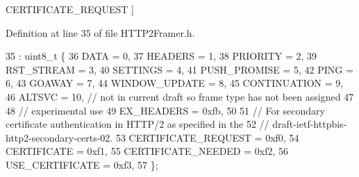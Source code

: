 \begin{Desc}
\begin{description}
{C\+E\+R\+T\+I\+F\+I\+C\+A\+T\+E\+\_\+\+R\+E\+Q\+U\+E\+ST\label{namespaceproxygen_1_1http2_a60a5f26de8e64ad7cc596791738df31ead3d3b002c0022969e52f9b0e87b8823e}
}]\item[{\em 
C\+E\+R\+T\+I\+F\+I\+C\+A\+TE\label{namespaceproxygen_1_1http2_a60a5f26de8e64ad7cc596791738df31eaad1694fa18786504d416601fa3e96d01}
}]\item[{\em 
C\+E\+R\+T\+I\+F\+I\+C\+A\+T\+E\+\_\+\+N\+E\+E\+D\+ED\label{namespaceproxygen_1_1http2_a60a5f26de8e64ad7cc596791738df31eae8c183fafade6ecd07a1f2fa4772ff36}
}]\item[{\em 
U\+S\+E\+\_\+\+C\+E\+R\+T\+I\+F\+I\+C\+A\+TE\label{namespaceproxygen_1_1http2_a60a5f26de8e64ad7cc596791738df31eafc95c08a1c670dd9fd29a94b13782e16}
}]\end{description}
\end{Desc}


Definition at line 35 of file H\+T\+T\+P2\+Framer.\+h.


\begin{DoxyCode}
35                      : uint8\_t \{
36   DATA = 0,
37   HEADERS = 1,
38   PRIORITY = 2,
39   RST_STREAM = 3,
40   SETTINGS = 4,
41   PUSH_PROMISE = 5,
42   PING = 6,
43   GOAWAY = 7,
44   WINDOW_UPDATE = 8,
45   CONTINUATION = 9,
46   ALTSVC = 10, \textcolor{comment}{// not in current draft so frame type has not been assigned}
47 
48   \textcolor{comment}{// experimental use}
49   EX_HEADERS = 0xfb,
50 
51   \textcolor{comment}{// For secondary certificate authentication in HTTP/2 as specified in the}
52   \textcolor{comment}{// draft-ietf-httpbis-http2-secondary-certs-02.}
53   CERTIFICATE_REQUEST = 0xf0,
54   CERTIFICATE = 0xf1,
55   CERTIFICATE_NEEDED = 0xf2,
56   USE_CERTIFICATE = 0xf3,
57 \};
\end{DoxyCode}


